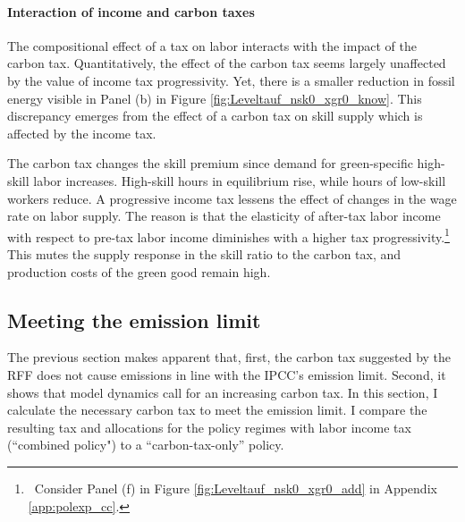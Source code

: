 
  
\paragraph{Interaction of income and carbon taxes}
The compositional effect of a tax on labor interacts with the impact of the carbon tax.
 Quantitatively, the effect of the carbon tax seems largely unaffected by the value of income tax progressivity.
 Yet, there is a smaller reduction in fossil energy visible in Panel (b) in Figure \ref{fig:Leveltauf_nsk0_xgr0_know}.
This discrepancy emerges from the effect of a carbon tax on skill supply which is affected by the income tax. 

    The carbon tax changes the skill premium since demand for green-specific high-skill labor increases. High-skill hours in equilibrium rise, while hours of low-skill workers reduce.  A progressive income tax lessens the effect of changes in the wage rate on labor supply. The reason is that the elasticity of after-tax labor income with respect to pre-tax labor income diminishes with a higher tax progressivity.\footnote{\ Consider Panel (f) in Figure \ref{fig:Leveltauf_nsk0_xgr0_add} in Appendix \ref{app:polexp_cc}.} This mutes the supply response in the skill ratio to the carbon tax, and production costs of the green good remain high.
   
  
\subsection{Meeting the emission limit}\label{subsec:meetlim}
 
The previous section makes apparent that, first, the carbon tax suggested by the RFF does not cause emissions in line with the IPCC's emission limit.  Second, it shows that model dynamics call for an increasing carbon tax. In this section, I calculate the necessary carbon tax to meet the emission limit. I compare the resulting tax and allocations for the policy regimes with labor income tax (``combined policy") to a ``carbon-tax-only'' policy.
 

